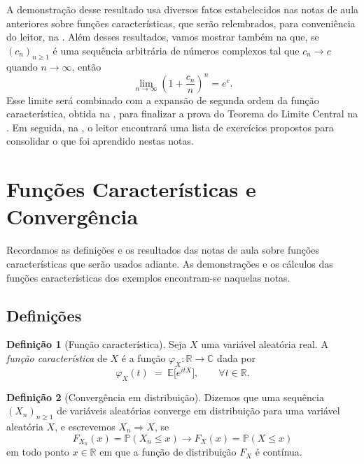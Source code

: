 \documentclass[12pt,portuguese]{article}
\theoremstyle{definition}
\newtheorem{definition}[definition]{Definição}
\theoremstyle{plainexercise}
\theoremstyle{starredexercise}
\theoremstyle{definition}
\begin{document}
A demonstração desse resultado usa diversos fatos estabelecidos nas notas de aula
anteriores sobre funções características, que serão relembrados, para conveniência
do leitor, na .
Além desses resultados, vamos mostrar também na 
que, se $(c_n)_{n\geqslant1}$ é uma sequência arbitrária de números complexos tal que $c_n \to c$
quando $n\to\infty$, então
\[
\lim_{n\to\infty} \left( 1+ \frac{c_n}{n}\right)^n  =  e^c.
\]
Esse limite será combinado com a expansão de segunda ordem da função
característica, obtida na ,
para finalizar a prova do Teorema do Limite Central na
. Em seguida, na ,
o leitor encontrará uma lista de exercícios propostos para consolidar o que foi aprendido nestas notas.


\section{Funções Características e Convergência}\label{sec:auxiliares}

Recordamos as definições e os resultados das notas de aula sobre funções
características que serão usados adiante. As demonstrações e os cálculos das
funções características dos exemplos encontram-se naquelas notas.

\subsection{Definições}\label{subsec:aux-definicoes}

\begin{definition}[Função característica]\label{def:func-caracteristica}
Seja $X$ uma variável aleatória real. A \emph{função característica} de $X$ é a função
$\varphi_{X}\colon\mathbb{R}\to\mathbb{C}$ dada por
\[
  \varphi_{X}(t) \;=\; \mathbb{E}\bigl[e^{itX}\bigr],
  \qquad \forall t\in\mathbb{R}.
\]
\end{definition}

\begin{definition}[Convergência em distribuição]\label{def:convergencia-distribuicao}
\label{def:man-conv-dist}
Dizemos que uma sequência $(X_n)_{n\geqslant1}$ de variáveis aleatórias converge
em distribuição para uma variável aleatória $X$, e escrevemos $X_n\Rightarrow X$,
se
\[
F_{X_n}(x)=\mathbb{P}(X_n\leqslant x)
\longrightarrow
F_X(x)=\mathbb{P}(X\leqslant x)
\]
em todo ponto $x\in\mathbb{R}$ em que a função de distribuição $F_X$ é contínua.
\end{definition}
\end{document}
